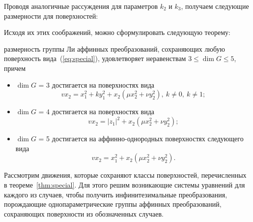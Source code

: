 \documentclass[../main.tex]{subfiles}
\begin{document}
Проводя аналогичные рассуждения для параметров $k_2$ и $k_3$, получаем следующие размерности для поверхностей:

Исходя их этих соображений, можно сформулировать следующую теорему:
\begin{theorem}\label{thm:special} размерность группы Ли аффинных преобразований, сохраняющих любую поверхность вида~(\ref{eq:special}), удовлетворяет неравенствам
$3 \le \dim G \le 5$, причем
\begin{itemize}
	\item $\dim G$ = 3 достигается на поверхностях вида
	\begin{equation}\label{eq:special_3}
		v x_2 = x_1^2 + k y_1^2 + x_2 (\mu x_2^2 + \nu y_2^2),\ k \ne 0, \ k \ne 1;
	\end{equation}
	\item $\dim G$ = 4 достигается на поверхностях вида
	\begin{equation}\label{eq:special_4}
		v x_2 = |z_1|^2 + x_2 (\mu x_2^2 + \nu y_2^2);
	\end{equation}
		\item $\dim G$ = 5 достигается на аффинно-однородных поверхностях следующего вида
	\begin{equation}\label{eq:special_5}
		v x_2 = x_1^2 + x_2 (\mu x_2^2 + \nu y_2^2).
	\end{equation}
\end{itemize}
\end{theorem}

Рассмотрим движения, которые сохраняют классы поверхностей, перечисленных в теореме~\ref{thm:special}. Для этого решим возникающие системы уравнений для каждого из случаев, чтобы получить инфинитезимальные преобразования, порождающие однопараметрические группы аффинных преобразований, сохраняющих поверхности из обозначенных случаев.
\end{document}
